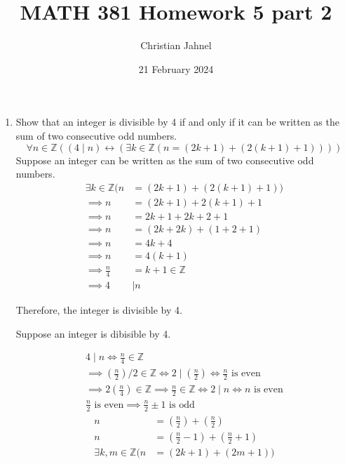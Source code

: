 \documentclass[letterpaper, 12pt]{article}
\title{MATH 381 Homework 5 part 2}
\author{Christian Jahnel}
\date{21 February 2024}
\newcommand{\integers}{\mathbb{Z}}
\begin{document}
\maketitle
\begin{enumerate}
\item Show that an integer is divisible by 4 if and only if it can be written as the sum of 
two consecutive odd numbers.
\[\forall n \in \integers ((4 \mid n) \leftrightarrow 
(\exists k \in \integers (n = (2k + 1) + (2(k + 1) + 1))))\]
Suppose an integer can be written as the sum of two consecutive odd numbers.
\begin{align*}
    \exists k \in \integers (n &= (2k + 1) + (2(k + 1) + 1)) \\
    \implies n &= (2k + 1) + 2(k + 1) + 1 \\
    \implies n &= 2k + 1 + 2k + 2 + 1 \\
    \implies n &= (2k + 2k) + (1 + 2 + 1) \\
    \implies n &= 4k + 4 \\
    \implies n &= 4(k + 1) \\
    \implies \frac{n}{4} &= k + 1 \in \integers \\
    \implies 4 &\mid n
\end{align*}
\begin{flushleft}
    Therefore, the integer is divisible by 4.
\end{flushleft}
\pagebreak
\begin{flushleft}
    Suppose an integer is dibisible by 4.
\end{flushleft}
\begin{gather*}
    4 \mid n \iff \frac{n}{4} \in \integers \\
    \implies \left(\frac{n}{2}\right) / 2 \in \integers 
    \iff 2 \mid \left(\frac{n}{2}\right) 
    \iff \frac{n}{2} \text{ is even} \\
    \implies 2\left(\frac{n}{4}\right) \in \integers 
    \implies \frac{n}{2} \in \integers 
    \iff 2 \mid n 
    \iff n \text{ is even} \\
    \frac{n}{2} \text{ is even} \implies \frac{n}{2} \pm 1 \text{ is odd}
\end{gather*}
\begin{align*}
    n &= \left(\frac{n}{2}\right) + \left(\frac{n}{2}\right) \\
    n &= \left(\frac{n}{2} - 1\right) + \left(\frac{n}{2} + 1\right) \\
    \exists k, m \in \integers (n &= (2k + 1) + (2m + 1))
\end{align*}

\end{enumerate}
\end{document}
